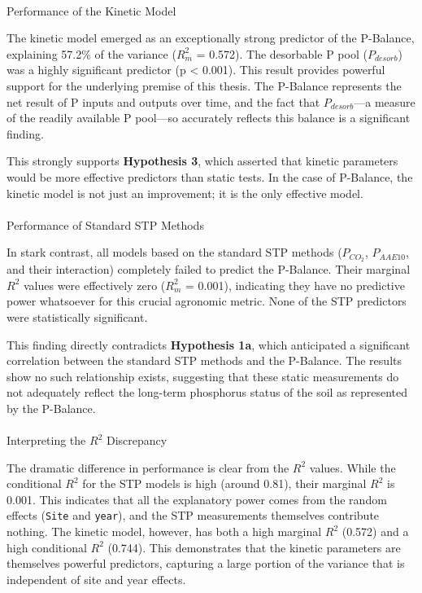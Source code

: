 \documentclass[
  a4paper,
]{article}
\makeatletter
\let\oldparagraph\paragraph
\renewcommand{\paragraph}{
    \@ifstar
      \xxxParagraphStar
      \xxxParagraphNoStar
  }
\newcommand{\xxxParagraphStar}[1]{\oldparagraph*{#1}\mbox{}}
\newcommand{\xxxParagraphNoStar}[1]{\oldparagraph{#1}\mbox{}}
\makeatother
\begin{document}
\paragraph{Performance of the Kinetic
Model}\label{performance-of-the-kinetic-model-2}

The kinetic model emerged as an exceptionally strong predictor of the
P-Balance, explaining 57.2\% of the variance (\(R^2_m\) = 0.572). The
desorbable P pool (\(P_{desorb}\)) was a highly significant predictor (p
\textless{} 0.001). This result provides powerful support for the
underlying premise of this thesis. The P-Balance represents the net
result of P inputs and outputs over time, and the fact that
\(P_{desorb}\)---a measure of the readily available P pool---so
accurately reflects this balance is a significant finding.

This strongly supports \textbf{Hypothesis 3}, which asserted that
kinetic parameters would be more effective predictors than static tests.
In the case of P-Balance, the kinetic model is not just an improvement;
it is the only effective model.

\paragraph{Performance of Standard STP
Methods}\label{performance-of-standard-stp-methods-2}

In stark contrast, all models based on the standard STP methods
(\(P_{CO_2}\), \(P_{AAE10}\), and their interaction) completely failed
to predict the P-Balance. Their marginal \(R^2\) values were effectively
zero (\(R^2_m\) = 0.001), indicating they have no predictive power
whatsoever for this crucial agronomic metric. None of the STP predictors
were statistically significant.

This finding directly contradicts \textbf{Hypothesis 1a}, which
anticipated a significant correlation between the standard STP methods
and the P-Balance. The results show no such relationship exists,
suggesting that these static measurements do not adequately reflect the
long-term phosphorus status of the soil as represented by the P-Balance.

\paragraph{\texorpdfstring{Interpreting the \(R^2\)
Discrepancy}{Interpreting the R\^{}2 Discrepancy}}\label{interpreting-the-r2-discrepancy}

The dramatic difference in performance is clear from the \(R^2\) values.
While the conditional \(R^2\) for the STP models is high (around 0.81),
their marginal \(R^2\) is 0.001. This indicates that all the explanatory
power comes from the random effects (\texttt{Site} and \texttt{year}),
and the STP measurements themselves contribute nothing. The kinetic
model, however, has both a high marginal \(R^2\) (0.572) and a high
conditional \(R^2\) (0.744). This demonstrates that the kinetic
parameters are themselves powerful predictors, capturing a large portion
of the variance that is independent of site and year effects.
\end{document}
